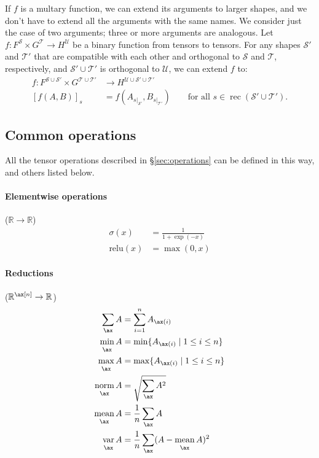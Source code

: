 \documentclass{article}
\DeclareMathOperator{\rec}{rec}
\newcommand{\restrict}[2]{\mathopen{}\left.#1\right|_{#2}}
\newcommand{\reals}{\mathbb{R}}
\begin{document}
If $f$ is a multary function, we can extend its arguments to larger shapes, and we don't have to extend all the arguments with the same names. We consider just the case of two arguments; three or more arguments are analogous. Let $f \colon F^{\mathcal{S}} \times G^{\mathcal{T}} \rightarrow H^{\mathcal{U}}$ be a binary function from tensors to tensors. For any shapes $\mathcal{S'}$ and $\mathcal{T'}$ that are compatible with each other and orthogonal to $\mathcal{S}$ and $\mathcal{T}$, respectively, and $\mathcal{S'} \cup \mathcal{T'}$ is orthogonal to $\mathcal{U}$, we can extend $f$ to:
\begin{align*}
f \colon F^{\mathcal{S} \cup \mathcal{S'}} \times G^{\mathcal{T} \cup \mathcal{T'}} &\rightarrow H^{\mathcal{U} \cup \mathcal{S'} \cup \mathcal{T'}} \\
  [f(A,B)]_s &= f\left(A_{\restrict{s}{\mathcal{S'}}},B_{\restrict{s}{\mathcal{T'}}}\right) \qquad \text{for all $s \in \rec (\mathcal{S'} \cup \mathcal{T'})$.}
\end{align*}

\subsection{Common operations}
\label{sec:commonops}

All the tensor operations described in \S\ref{sec:operations} can be defined in this way, and others listed below.

\paragraph{Elementwise operations} ($\reals \rightarrow \reals$)
\begin{align*}
  \sigma(x) &= \frac{1}{1+\exp(-x)} \\
  \text{relu}(x) &= \max(0, x)
\end{align*}

\paragraph{Reductions} ($\reals^{\ax[n]} \rightarrow \reals$)
\begin{align*}
  \nsum{\ax} A &= \sum_{i=1}^n A_{\ax(i)} \\
  \nfun{\ax}{min} A &= \min \{A_{\ax(i)} \mid 1 \leq i \leq n\} \\
  \nfun{\ax}{max} A &= \max \{A_{\ax(i)} \mid 1 \leq i \leq n\} \\
  \nfun{\ax}{norm} A &= \sqrt{\nsum{\ax} A^2} \\
  \nfun{\ax}{mean} A &= \frac{1}{n} \nsum{\ax} A \\
  \nfun{\ax}{var} A &= \frac{1}{n} \nsum{\ax} (A - \nfun{\ax}{mean} A)^2
\end{align*}
\end{document}
